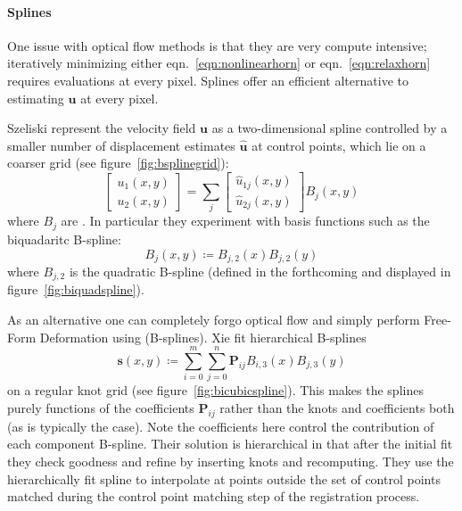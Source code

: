 \paragraph{Splines}\label{pgraph:splines}


One issue with optical flow methods is that they are very compute intensive; iteratively minimizing either eqn.~\eqref{eqn:nonlinearhorn} or eqn.~\eqref{eqn:relaxhorn} requires evaluations at every pixel.
%
Splines offer an efficient alternative to estimating \(\mathbf{u}\) at every pixel.
%

Szeliski \etal  \cite{szeliski1997spline} represent the velocity field \(\mathbf{u}\) as a two-dimensional spline controlled by a smaller number of displacement estimates \(\hat{\mathbf{u}}\) at control points, which lie on a coarser grid (see figure~\ref{fig:bsplinegrid}):
%
\begin{equation}
	\begin{bmatrix}
		u_1(x,y) \\ u_2(x,y)
	\end{bmatrix} = \sum_j \begin{bmatrix}
		\hat{u}_{1j}(x,y) \\ \hat{u}_{2j}(x,y)
	\end{bmatrix} B_j(x, y)
\end{equation}
where \(B_j\) are .
%
In particular they experiment with basis functions such as the biquadaritc B-spline:
\[
	B_j(x,y) \coloneqq B_{j,2}(x) B_{j,2}(y)
\]
where \(B_{j,2}\) is the quadratic B-spline (defined in the forthcoming and displayed in figure~\ref{fig:biquadspline}).

As an alternative one can completely forgo optical flow and simply perform Free-Form Deformation \cite{xie2004} using  (B-splines).
%
Xie \etal \cite{xie2004} fit hierarchical B-splines
\begin{equation}
	\mathbf{s}(x,y) \coloneqq \sum_{i=0}^m\sum_{j=0}^n \mathbf{P}_{ij} B_{i,3}(x) B_{j,3}(y)
\end{equation}
on a regular knot grid (see figure~\ref{fig:bicubicspline}).
%
This makes the splines purely functions of the coefficients \(\mathbf{P}_{ij}\) rather than the knots and coefficients both (as is typically the case).
%
Note the coefficients here control the contribution of each component B-spline.
%
Their solution is hierarchical in that after the initial fit they check goodness and refine by inserting knots and recomputing.
%
They use the hierarchically fit spline to interpolate at points outside the set of control points matched during the control point matching step of the registration process.
%
